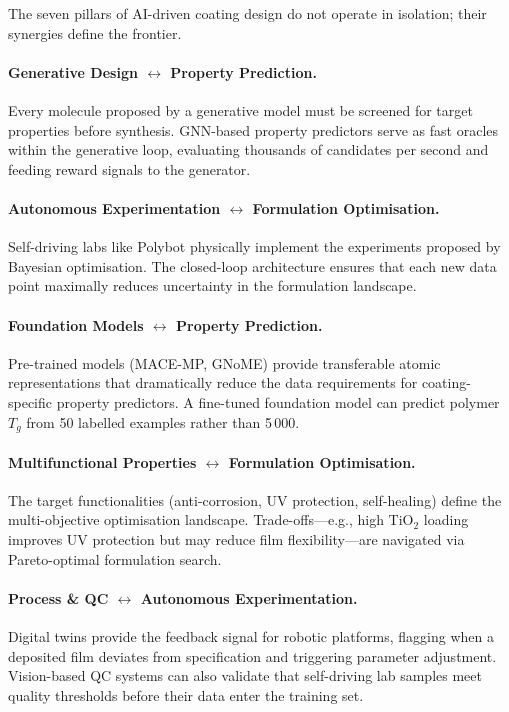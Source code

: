 \documentclass[11pt,a4paper]{article}
\begin{document}
The seven pillars of AI-driven coating design do not operate in isolation; their synergies define the frontier.

\paragraph{Generative Design $\leftrightarrow$ Property Prediction.}
Every molecule proposed by a generative model must be screened for target properties before synthesis.
GNN-based property predictors serve as fast oracles within the generative loop, evaluating thousands of candidates per second and feeding reward signals to the generator.

\paragraph{Autonomous Experimentation $\leftrightarrow$ Formulation Optimisation.}
Self-driving labs like Polybot physically implement the experiments proposed by Bayesian optimisation.
The closed-loop architecture ensures that each new data point maximally reduces uncertainty in the formulation landscape.

\paragraph{Foundation Models $\leftrightarrow$ Property Prediction.}
Pre-trained models (MACE-MP, GNoME) provide transferable atomic representations that dramatically reduce the data requirements for coating-specific property predictors.
A fine-tuned foundation model can predict polymer $T_g$ from 50 labelled examples rather than 5\,000.

\paragraph{Multifunctional Properties $\leftrightarrow$ Formulation Optimisation.}
The target functionalities (anti-corrosion, UV protection, self-healing) define the multi-objective optimisation landscape.
Trade-offs---e.g., high TiO$_2$ loading improves UV protection but may reduce film flexibility---are navigated via Pareto-optimal formulation search.

\paragraph{Process \& QC $\leftrightarrow$ Autonomous Experimentation.}
Digital twins provide the feedback signal for robotic platforms, flagging when a deposited film deviates from specification and triggering parameter adjustment.
Vision-based QC systems can also validate that self-driving lab samples meet quality thresholds before their data enter the training set.
\end{document}
